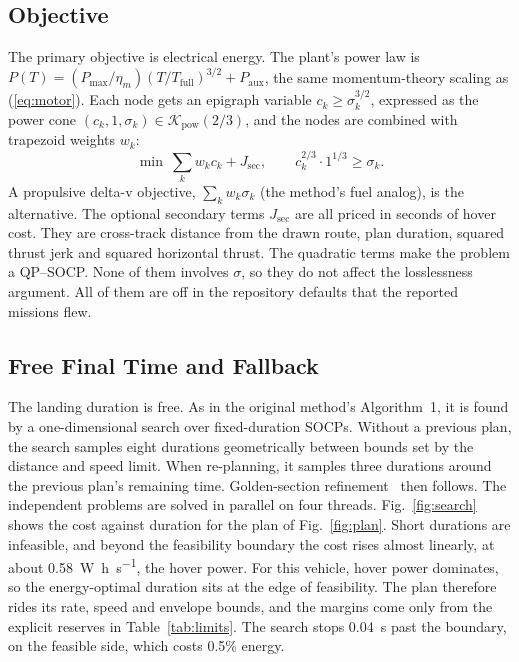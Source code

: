 \documentclass[journal]{IEEEtran}
\newcommand{\refeq}[1]{(\ref{#1})}
\newcommand{\reffig}[1]{Fig.~\ref{#1}}
\newcommand{\reftab}[1]{Table~\ref{#1}}
\begin{document}
\subsection{Objective}
\label{sec:objective}

The primary objective is electrical energy.
The plant's power law is $P(T) = (P_{\max}/\eta_m)(T/T_{\text{full}})^{3/2} + P_{\text{aux}}$, the same momentum-theory scaling as \refeq{eq:motor}.
Each node gets an epigraph variable $c_k \ge \sigma_k^{3/2}$, expressed as the power cone $(c_k, 1, \sigma_k) \in \mathcal{K}_{\text{pow}}(2/3)$, and the nodes are combined with trapezoid weights $w_k$:
\begin{equation}
\min\ \sum_k w_k c_k + J_{\text{sec}}, \qquad c_k^{2/3}\cdot 1^{1/3} \ge \sigma_k .
\label{eq:energy}
\end{equation}
A propulsive delta-v objective, $\sum_k w_k\sigma_k$ (the method's fuel analog), is the alternative.
The optional secondary terms $J_{\text{sec}}$ are all priced in seconds of hover cost.
They are cross-track distance from the drawn route, plan duration, squared thrust jerk and squared horizontal thrust.
The quadratic terms make the problem a QP--SOCP.
None of them involves $\sigma$, so they do not affect the losslessness argument.
All of them are off in the repository defaults that the reported missions flew.

\subsection{Free Final Time and Fallback}
\label{sec:freetime}

The landing duration is free.
As in the original method's Algorithm~1, it is found by a one-dimensional search over fixed-duration SOCPs.
Without a previous plan, the search samples eight durations geometrically between bounds set by the distance and speed limit.
When re-planning, it samples three durations around the previous plan's remaining time.
Golden-section refinement~\cite{kiefer1953} then follows.
The independent problems are solved in parallel on four threads.
\reffig{fig:search} shows the cost against duration for the plan of \reffig{fig:plan}.
Short durations are infeasible, and beyond the feasibility boundary the cost rises almost linearly, at about \SI{0.58}{\watt\hour\per\second}, the hover power.
For this vehicle, hover power dominates, so the energy-optimal duration sits at the edge of feasibility.
The plan therefore rides its rate, speed and envelope bounds, and the margins come only from the explicit reserves in \reftab{tab:limits}.
The search stops \SI{0.04}{\second} past the boundary, on the feasible side, which costs 0.5\% energy.
\end{document}
